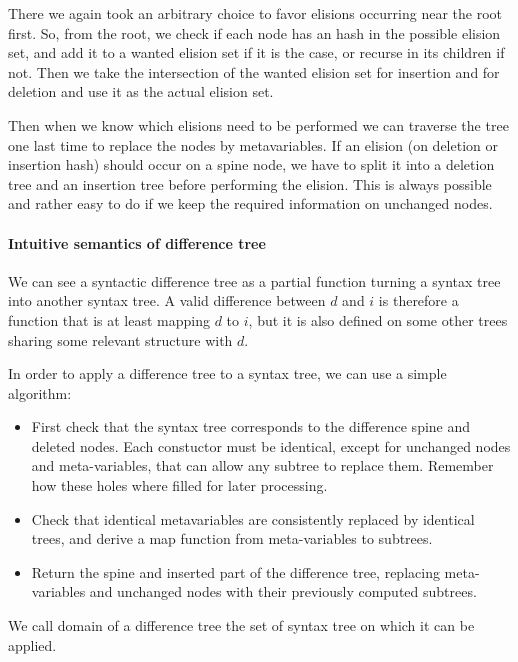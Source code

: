 \documentclass[a4paper,11pt]{article}
\begin{document}
There we again took an arbitrary choice to favor elisions occurring near the
root first. So, from the root, we check if each node has an hash in the
possible elision set, and add it to a wanted elision set if it is the case, or
recurse in its children if not. Then we take the intersection of the wanted
elision set for insertion and for deletion and use it as the actual elision set.

Then when we know which elisions need to be performed we can traverse the tree
one last time to replace the nodes by metavariables. If an elision (on
deletion or insertion hash) should occur on a spine node, we have to split it
into a deletion tree and an insertion tree before performing the elision. This
is always possible and rather easy to do if we keep the required information on
unchanged nodes.

\paragraph{Intuitive semantics of difference tree}
\label{sec:diff_application}

We can see a syntactic difference tree as a partial function turning a syntax
tree into another syntax tree. A valid difference between $d$ and $i$ is
therefore a function that is at least mapping $d$ to $i$, but it is
also defined on some other trees sharing some relevant structure with $d$.

In order to apply a difference tree to a syntax tree, we can use a simple
algorithm:
\begin{itemize}
 \item First check that the syntax tree corresponds to the difference spine and
deleted nodes. Each constuctor must be identical, except for unchanged nodes
and meta-variables, that can allow any subtree to replace them. Remember how
these holes where filled for later processing.
 \item Check that identical metavariables are consistently replaced by
identical trees, and derive a map function from meta-variables to subtrees.
 \item Return the spine and inserted part of the difference tree, replacing
meta-variables and unchanged nodes with their previously computed subtrees.
\end{itemize}

We call domain of a difference tree the set of syntax tree on which it can be
applied.
\end{document}
